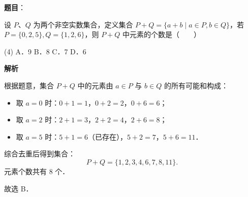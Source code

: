 
\begin{answer}

\textbf{题目}：

设 $P$、$Q$ 为两个非空实数集合，定义集合 $P + Q = \{a + b \mid a \in P, b \in Q\}$，若 $P = \{0, 2, 5\}, Q = \{1, 2, 6\}$，则 $P + Q$ 中元素的个数是\mbox{（　　）}

\begin{gkopts}(4)
\task A．9
\task B．8
\task C．7
\task D．6
\end{gkopts}

\textbf{解析}

根据题意，集合 $P + Q$ 中的元素由 $a \in P$ 与 $b \in Q$ 的所有可能和构成：
\begin{itemize}
\item 取 $a = 0$ 时：$0 + 1 = 1$，$0 + 2 = 2$，$0 + 6 = 6$；
\item 取 $a = 2$ 时：$2 + 1 = 3$，$2 + 2 = 4$，$2 + 6 = 8$；
\item 取 $a = 5$ 时：$5 + 1 = 6$（已存在），$5 + 2 = 7$，$5 + 6 = 11$．
\end{itemize}

综合去重后得到集合：
\nopagebreak[4]
\[
P + Q = \{1, 2, 3, 4, 6, 7, 8, 11\}.
\]
元素个数共有 8 个．

故选 B．


\end{answer}
